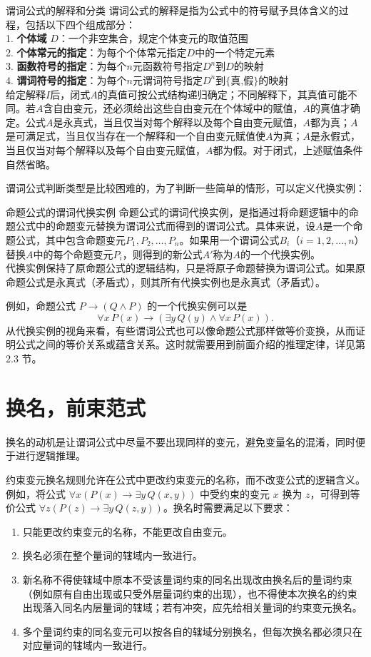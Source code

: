 \documentclass[lang=cn,11pt]{elegantbook}
\begin{document}
\begin{definition}{谓词公式的解释和分类}
谓词公式的解释是指为公式中的符号赋予具体含义的过程，包括以下四个组成部分：\\
1. \textbf{个体域} $D$：一个非空集合，规定个体变元的取值范围\\
2. \textbf{个体常元的指定}：为每个个体常元指定$D$中的一个特定元素\\
3. \textbf{函数符号的指定}：为每个$n$元函数符号指定$D^n$到$D$的映射\\
4. \textbf{谓词符号的指定}：为每个$n$元谓词符号指定$D^n$到$\{\text{真,假}\}$的映射\\
给定解释$I$后，闭式$A$的真值可按公式结构递归确定；不同解释下，其真值可能不同。若$A$含自由变元，还必须给出这些自由变元在个体域中的赋值，$A$的真值才确定。公式$A$是永真式，当且仅当对每个解释以及每个自由变元赋值，$A$都为真；$A$是可满足式，当且仅当存在一个解释和一个自由变元赋值使$A$为真；$A$是永假式，当且仅当对每个解释以及每个自由变元赋值，$A$都为假。对于闭式，上述赋值条件自然省略。
\end{definition}
谓词公式判断类型是比较困难的，为了判断一些简单的情形，可以定义代换实例：
\begin{definition}{命题公式的谓词代换实例}
命题公式的谓词代换实例，是指通过将命题逻辑中的命题公式中的命题变元替换为谓词公式而得到的谓词公式。具体来说，设$A$是一个命题公式，其中包含命题变元$P_1, P_2, \ldots, P_n$。如果用一个谓词公式$B_i$（$i = 1, 2, \ldots, n$）替换$A$中的每个命题变元$P_i$，则得到的新公式$A'$称为$A$的一个代换实例。\\
代换实例保持了原命题公式的逻辑结构，只是将原子命题替换为谓词公式。如果原命题公式是永真式（矛盾式），则其所有代换实例也是永真式（矛盾式）。
\end{definition}
例如，命题公式 $P \rightarrow (Q \land P)$ 的一个代换实例可以是
\[
\forall x\, P(x) \rightarrow (\exists y\, Q(y) \land \forall x\, P(x)).
\]
从代换实例的视角来看，有些谓词公式也可以像命题公式那样做等价变换，从而证明公式之间的等价关系或蕴含关系。这时就需要用到前面介绍的推理定律，详见第 2.3 节。
\section{换名，前束范式}
换名的动机是让谓词公式中尽量不要出现同样的变元，避免变量名的混淆，同时便于进行逻辑推理。

约束变元换名规则允许在公式中更改约束变元的名称，而不改变公式的逻辑含义。例如，将公式 $\forall x (P(x) \rightarrow \exists y\, Q(x,y))$ 中受约束的变元 $x$ 换为 $z$，可得到等价公式 $\forall z (P(z) \rightarrow \exists y\, Q(z,y))$。换名时需要满足以下要求：
\begin{enumerate}
    \item 只能更改约束变元的名称，不能更改自由变元。
    \item 换名必须在整个量词的辖域内一致进行。
    \item 新名称不得使辖域中原本不受该量词约束的同名出现改由换名后的量词约束（例如原有自由出现或只受外层量词约束的出现），也不得使本次换名的约束出现落入同名内层量词的辖域；若有冲突，应先给相关量词的约束变元换名。
    \item 多个量词约束的同名变元可以按各自的辖域分别换名，但每次换名都必须只在对应量词的辖域内一致进行。
\end{enumerate}
\end{document}
